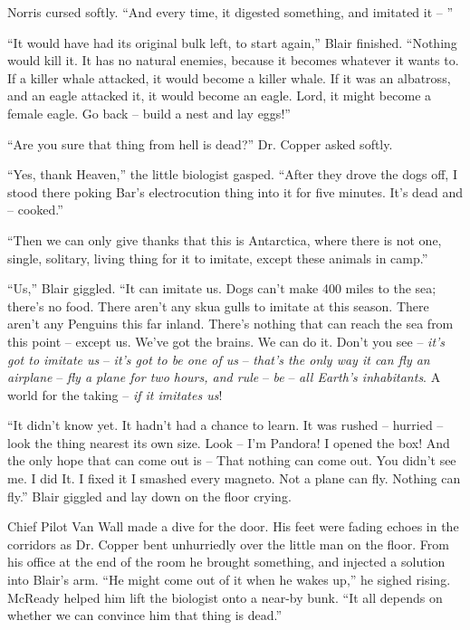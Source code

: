 \documentclass[ebook,oneside,11pt]{memoir}				%
\begin{document}
Norris cursed softly. ``And every time, it digested something, and imitated it -- ''

``It would have had its original bulk left, to start again,'' Blair finished. ``Nothing would kill it. It has no natural enemies, because it becomes whatever it wants to. If a killer whale attacked, it would become a killer whale. If it was an albatross, and an eagle attacked it, it would become an eagle. Lord, it might become a female eagle. Go back -- build a nest and lay eggs!''

``Are you sure that thing from hell is dead?'' Dr. Copper asked softly.

``Yes, thank Heaven,'' the little biologist gasped. ``After they drove the dogs off, I stood there poking Bar's electrocution thing into it for five minutes. It's dead and -- cooked.''

``Then we can only give thanks that this is Antarctica, where there is not one, single, solitary, living thing for it to imitate, except these animals in camp.''

``Us,'' Blair giggled. ``It can imitate us. Dogs can't make 400 miles to the sea; there's no food. There aren't any skua gulls to imitate at this season. There aren't any Penguins this far inland. There's nothing that can reach the sea from this point -- except us. We've got the brains. We can do it. Don't you see -- \emph{it's got to imitate us} -- \emph{it's got to be one of us} -- \emph{that's the only way it can fly an airplane} -- \emph{fly a plane for two hours, and rule} -- \emph{be} -- \emph{all Earth's inhabitants}. A world for the taking -- \emph{if it imitates us}!

``It didn't know yet. It hadn't had a chance to learn. It was rushed -- hurried -- look the thing nearest its own size. Look -- I'm Pandora! I opened the box! And the only hope that can come out is -- That nothing can come out. You didn't see me. I did It. I fixed it I smashed every magneto. Not a plane can fly. Nothing can fly.'' Blair giggled and lay down on the floor crying.

Chief Pilot Van Wall made a dive for the door. His feet were fading echoes in the corridors as Dr. Copper bent unhurriedly over the little man on the floor. From his office at the end of the room he brought something, and injected a solution into Blair's arm. ``He might come out of it when he wakes up,'' he sighed rising. McReady helped him lift the biologist onto a near-by bunk. ``It all depends on whether we can convince him that thing is dead.''
\end{document}

